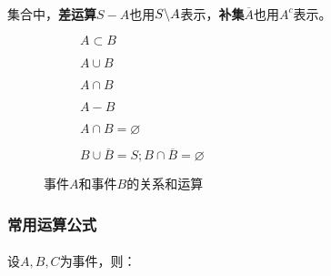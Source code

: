 \paragraph{}
集合中，\textbf{差运算}$S - A$也用$S \symbol{92} A$表示，\textbf{补集}$\overline{A}$也用$A^{c}$表示。

\begin{figure}[h]
\centering
  \begin{subfigure}[t]{0.3\linewidth}
    \centering
      
      \caption{$A \subset B$}
      \label{1_A_subset_B}
  \end{subfigure}
  \begin{subfigure}[t]{0.3\linewidth}
    \centering
      
      \caption{$A \cup B$}
      \label{1_A_cup_B}
  \end{subfigure}
  \begin{subfigure}[t]{0.3\linewidth}
    \centering
      
      \caption{$A \cap B$}
      \label{1_A_cap_B}
  \end{subfigure}

  \bigskip %
  \begin{subfigure}[b]{0.3\linewidth}
    \centering
      
      \caption{$A - B$}
      \label{1_A_diffence_B}
  \end{subfigure}
  \begin{subfigure}[b]{0.3\linewidth}
    \centering
      
      \caption{$A \cap B = \varnothing$}
      \label{1_A_cap_nothing_B}
  \end{subfigure}
  \begin{subfigure}[b]{0.3\linewidth}
    \centering
      
      \caption{$B \cup \overline{B} = S; B \cap \overline{B} = \varnothing$}
      \label{1_B_complement}
  \end{subfigure}
  \caption{事件$A$和事件$B$的关系和运算}
  \label{事件A和事件B的关系和运算}
\end{figure}

\subsubsection{常用运算公式}
\paragraph{}
设$A, B, C$为事件，则：

